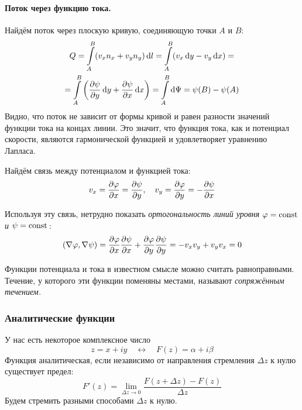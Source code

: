 \paragraph{Поток через функцию тока.} Найдём поток через плоскую
кривую, соединяющую точки $A$ и $B$:
\begin{gather}
    Q = \int\limits_A^B (v_x n_x + v_y n_y)\dd{l}=
    \int\limits_A^B (v_x \dd{y} - v_y \dd{x})=\\=
    \int\limits_A^B \qty(\pdv{\psi}{y}\dd{y}+\pdv{\psi}{x}\dd{x})=
    \int\limits_A^B \dd{\Psi} = \psi(B)-\psi(A)
\end{gather}
Видно, что поток не зависит от формы кривой и равен разности значений
функции тока на концах линии. Это значит, что функция тока, как и потенциал скорости, являются гармонической функцией и удовлетворяет уравнению Лапласа.

Найдём связь между потенциалом и функцией тока:
\begin{equation}
    v_x = \pdv{\varphi}{x}= \pdv{\psi}{y}, \quad
    v_y = \pdv{\varphi}{y} = -\pdv{\psi}{x}
\end{equation}

Используя эту связь, нетрудно показать \textit{ортогональность линий
уровня $\varphi=\mathrm{const}\,$ и $\psi=\mathrm{const}\,$}:
\begin{equation}
    \qty(\nabla\varphi,\nabla\psi) =
    \pdv{\varphi}{x}\pdv{\psi}{x} +
    \pdv{\varphi}{y}\pdv{\psi}{y} = -v_x v_y+ v_y v_x = 0
\end{equation}

Функции потенциала и тока в известном смысле можно считать равноправными. Течение, у которого эти функции поменяны местами, называют \textit{сопряжённым течением.}


\subsubsection{Аналитические функции}

У нас есть некоторое комплексное число
\begin{equation}
	z=x+iy 
	\quad \leftrightarrow \quad
	F(z)=\alpha+i \beta
\end{equation}
Функция аналитическая, если независимо от направления стремления $\Delta z$ к нулю существует предел:
\begin{equation}
	F'(z)=\lim\limits_{\Delta z\to0}\frac{F(z+\Delta z)-F(z)}{\Delta z}
\end{equation}
Будем стремить разными способами $\Delta z$ к нулю.

